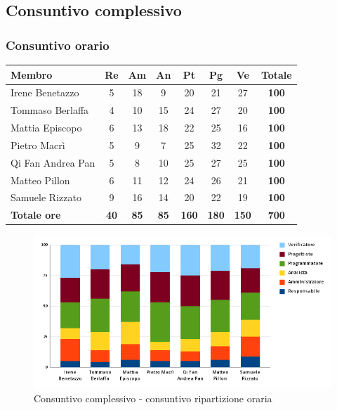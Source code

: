 \subsection{Consuntivo complessivo}
\subsubsection{Consuntivo orario}
\begin{center}
	\renewcommand{\arraystretch}{1.8} %
	\begin{tabular}{ |m{8em}|c|c|c|c|c|c|c| }
	\hline
	\textbf{Membro} & \textbf{Re} & \textbf{Am} &  \textbf{An} &  \textbf{Pt} &  \textbf{Pg} &  \textbf{Ve} &  \textbf{Totale}\\
    \hline
    Irene Benetazzo   & 5 & 18 & 9  & 20 & 21 & 27 & \textbf{100} \\
    \hline
    Tommaso Berlaffa  & 4 & 10 & 15 & 24 & 27 & 20 & \textbf{100} \\
    \hline
    Mattia Episcopo   & 6 & 13 & 18 & 22 & 25 & 16 & \textbf{100} \\
    \hline
    Pietro Macrì      & 5 & 9  & 7  & 25 & 32 & 22 & \textbf{100} \\
    \hline
    Qi Fan Andrea Pan & 5 & 8  & 10 & 25 & 27 & 25 & \textbf{100} \\
    \hline
    Matteo Pillon     & 6 & 11 & 12 & 24 & 26 & 21 & \textbf{100} \\
    \hline
    Samuele Rizzato   & 9 & 16 & 14 & 20 & 22 & 19 & \textbf{100} \\
    \hline
    \textbf{Totale ore} & \textbf{40} & \textbf{85}  & \textbf{85} &  \textbf{160} &  \textbf{180} &  \textbf{150} &  \textbf{700}\\
    \hline
	\end{tabular}
\end{center}

\begin{figure}[H]
    \centering\includegraphics[width=\textwidth, height=\textheight,keepaspectratio]{images/consuntivo/Complessivo-orario.png}
    \caption{Consuntivo complessivo - consuntivo ripartizione oraria}
\end{figure}


